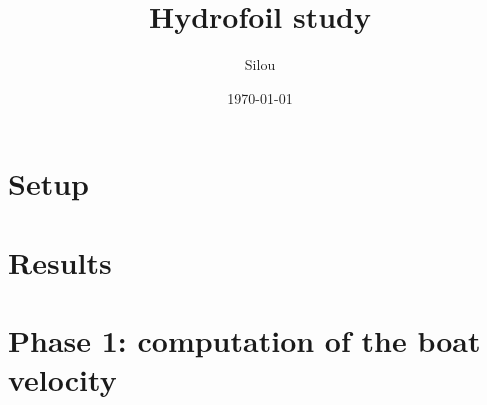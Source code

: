 \documentclass[12pt]{article}
\author{Silou}
\date{\today}
\title{Hydrofoil study}
\begin{document}
  

    \maketitle
    

    \clearpage
    \section{Setup}
    

    \clearpage
    \section{Results}
    

    \cleardoublepage
    \section{Phase 1: computation of the boat velocity}
    

    \clearpage
    \cite{Pavou}
    
    
\end{document}
